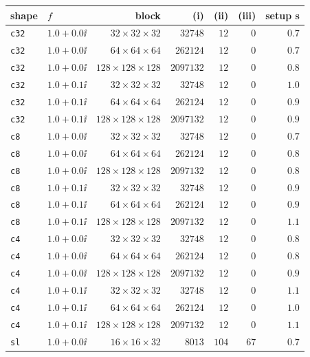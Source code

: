 \begin{tabular}{llrrrrr}
\toprule
shape & $f$ & block & (i) & (ii) & (iii) & setup s \\
\midrule
\texttt{c32} & $1.0+0.0\ii$ & $32\!\times\!32\!\times\!32$ & $32748$ & $12$ & $0$ & $0.7$ \\
\texttt{c32} & $1.0+0.0\ii$ & $64\!\times\!64\!\times\!64$ & $262124$ & $12$ & $0$ & $0.7$ \\
\texttt{c32} & $1.0+0.0\ii$ & $128\!\times\!128\!\times\!128$ & $2097132$ & $12$ & $0$ & $0.8$ \\
\texttt{c32} & $1.0+0.1\ii$ & $32\!\times\!32\!\times\!32$ & $32748$ & $12$ & $0$ & $1.0$ \\
\texttt{c32} & $1.0+0.1\ii$ & $64\!\times\!64\!\times\!64$ & $262124$ & $12$ & $0$ & $0.9$ \\
\texttt{c32} & $1.0+0.1\ii$ & $128\!\times\!128\!\times\!128$ & $2097132$ & $12$ & $0$ & $0.9$ \\
\texttt{c8} & $1.0+0.0\ii$ & $32\!\times\!32\!\times\!32$ & $32748$ & $12$ & $0$ & $0.7$ \\
\texttt{c8} & $1.0+0.0\ii$ & $64\!\times\!64\!\times\!64$ & $262124$ & $12$ & $0$ & $0.8$ \\
\texttt{c8} & $1.0+0.0\ii$ & $128\!\times\!128\!\times\!128$ & $2097132$ & $12$ & $0$ & $0.8$ \\
\texttt{c8} & $1.0+0.1\ii$ & $32\!\times\!32\!\times\!32$ & $32748$ & $12$ & $0$ & $0.9$ \\
\texttt{c8} & $1.0+0.1\ii$ & $64\!\times\!64\!\times\!64$ & $262124$ & $12$ & $0$ & $0.9$ \\
\texttt{c8} & $1.0+0.1\ii$ & $128\!\times\!128\!\times\!128$ & $2097132$ & $12$ & $0$ & $1.1$ \\
\texttt{c4} & $1.0+0.0\ii$ & $32\!\times\!32\!\times\!32$ & $32748$ & $12$ & $0$ & $0.8$ \\
\texttt{c4} & $1.0+0.0\ii$ & $64\!\times\!64\!\times\!64$ & $262124$ & $12$ & $0$ & $0.8$ \\
\texttt{c4} & $1.0+0.0\ii$ & $128\!\times\!128\!\times\!128$ & $2097132$ & $12$ & $0$ & $0.9$ \\
\texttt{c4} & $1.0+0.1\ii$ & $32\!\times\!32\!\times\!32$ & $32748$ & $12$ & $0$ & $1.1$ \\
\texttt{c4} & $1.0+0.1\ii$ & $64\!\times\!64\!\times\!64$ & $262124$ & $12$ & $0$ & $1.0$ \\
\texttt{c4} & $1.0+0.1\ii$ & $128\!\times\!128\!\times\!128$ & $2097132$ & $12$ & $0$ & $1.1$ \\
\texttt{sl} & $1.0+0.0\ii$ & $16\!\times\!16\!\times\!32$ & $8013$ & $104$ & $67$ & $0.7$ \\

\end{tabular}
